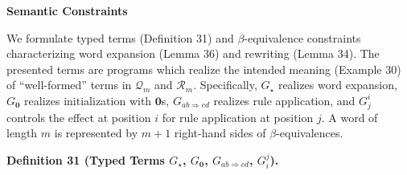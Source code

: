 \documentclass[10pt,a4paper]{amsart}
\begin{document}
 
 
\par\medskip\noindent\textbf{Semantic Constraints}\par
 
 
We formulate typed terms (Definition 31) and $\beta$-equivalence constraints characterizing word expansion (Lemma 36) and rewriting (Lemma 34). The presented terms are programs which realize the intended meaning (Example 30) of “well-formed” terms in $\mathcal{Q}_{m}$ and $\mathcal{R}_{m}$. Specifically, $G_{\star}$ realizes word expansion, $G_{\mathbf{0}}$ realizes initialization with $\mathbf{0}$s, $G_{ab\Rightarrow cd}$ realizes rule application, and $G_{j}^{i}$ controls the effect at position $i$ for rule application at position $j$. A word of length $m$ is represented by $m+1$ right-hand sides of $\beta$-equivalences.\par
 
 
 
\par\medskip\noindent\textbf{Definition 31 (Typed Terms $G_{\star}$, $G_{\mathbf{0}}$, $G_{ab\Rightarrow cd}$, $G_{i}^{j}$).}\par
 
\end{document}
